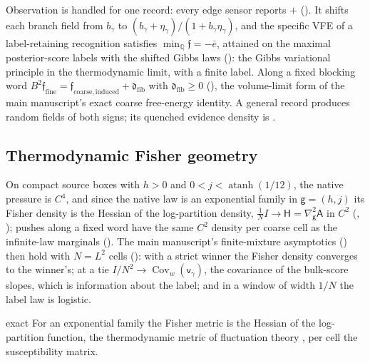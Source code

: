 Observation is handled for one record: every edge sensor reports \(+\)
(). It shifts each branch field from \(b_\gamma\) to
\((b_\gamma+\eta_\gamma)/(1+b_\gamma\eta_\gamma)\), and the specific VFE of a label-retaining recognition
satisfies \(\min_{\mathbb Q}\mathfrak f=-\bar e\), attained on the maximal posterior-score labels with the
shifted Gibbs laws (): the Gibbs variational principle in the
thermodynamic limit, with a finite label. Along a fixed blocking word
\(B^2\mathfrak f_{\mathrm{fine}}=\mathfrak f_{\mathrm{coarse,induced}}+\mathfrak d_{\mathrm{fib}}\) with
\(\mathfrak d_{\mathrm{fib}}\geq0\) (), the volume-limit form of the main
manuscript's exact coarse free-energy identity. A general record produces random fields of both signs;
its quenched evidence density is .

\subsection{Thermodynamic Fisher geometry}
\label{comp:sb-thermo-fisher}

On compact source boxes with \(h>0\) and \(0<j<\operatorname{atanh}(1/12)\), the native pressure is \(C^4\),
and since the native law is an exponential family in \(\mathsf g=(h,j)\) its Fisher density is the Hessian
of the log-partition density, \(\tfrac1NI\to\mathsf H=\nabla^2_{\mathsf g}\mathsf A\) in \(C^2\)
(, ); pushes along a fixed word
have the same \(C^2\) density per coarse cell as the infinite-law marginals
(). The main manuscript's finite-mixture asymptotics
() then hold with \(N=L^2\) cells
(): with a strict winner the Fisher density converges to the winner's;
at a tie \(I/N^2\to\operatorname{Cov}_w(\mathsf v_\gamma)\), the covariance of the bulk-score slopes, which is
information about the label; and in a window of width \(1/N\) the label law is logistic.

\begin{analogy}{exact}
For an exponential family the Fisher metric is the Hessian of the log-partition function, the thermodynamic
metric of fluctuation theory \citep{Crooks2007}, per cell the susceptibility matrix.
\end{analogy}

